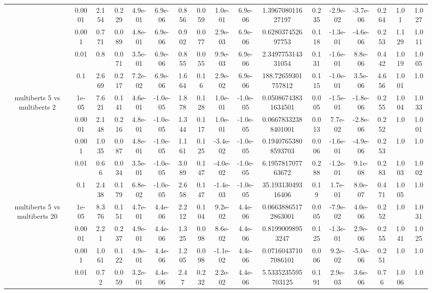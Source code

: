 \begin{tabular}{|c|c|c|c|c|c|c|c|c|c|c|c|c|c|c|c|c|}
 & 0.0001 & 2.154 & 0.229 & 4.9e-01 & 6.9e-06 & 0.856 & 0.059 & 1.0e-01 & 6.9e-06 & 1.396708011627197 & 0.235 & -2.9e-02 & -3.7e-06 & 0.264 & 1.01 & 1.027 \\
 & 0.001 & 0.771 & 0.089 & 4.8e-01 & 6.9e-06 & 0.902 & 0.077 & 2.9e-03 & 6.9e-06 & 0.628037452697753 & 0.118 & -1.3e-01 & -4.6e-06 & 0.253 & 1.129 & 1.011 \\
 & 0.01 & 0.8 & 0.071 & 3.5e-01 & 6.9e-06 & 0.855 & 0.055 & 9.9e-03 & 6.9e-06 & 2.349775314331054 & 0.131 & -1.6e-01 & 8.8e-06 & 0.442 & 1.019 & 1.005 \\
 & 0.1 & 2.669 & 0.217 & 7.2e-02 & 6.9e-06 & 1.664 & 0.16 & 2.9e-02 & 6.9e-06 & 188.72659301757812 & 0.115 & -1.0e-01 & 3.5e-06 & 4.656 & 1.001 & 1.0 \\
\hline
\multirow{5}{*}{multiberts 5 vs multiberts 2} & 1e-05 & 7.621 & 0.141 & 4.6e-01 & -1.0e-05 & 1.878 & 0.128 & 1.0e-01 & -1.0e-05 & 0.05086743831634501 & 0.005 & -1.5e-01 & -1.8e-06 & 0.255 & 1.004 & 1.033 \\
 & 0.0001 & 2.148 & 0.216 & 4.8e-01 & -1.0e-05 & 1.344 & 0.117 & 1.0e-01 & -1.0e-05 & 0.06678332388401001 & 0.013 & 7.7e-02 & -2.8e-06 & 0.252 & 1.0 & 1.001 \\
 & 0.001 & 1.035 & 0.087 & 4.8e-01 & -1.0e-05 & 1.161 & 0.125 & -3.4e-02 & -1.0e-05 & 0.19407653808593703 & 0.006 & -1.6e-01 & -4.9e-06 & 0.253 & 1.0 & 1.0 \\
 & 0.01 & 0.66 & 0.034 & 3.5e-01 & -1.0e-05 & 3.089 & 0.147 & -4.0e-02 & -1.0e-05 & 6.195781707763672 & 0.288 & -1.2e-01 & 9.1e-08 & 0.283 & 1.003 & 1.002 \\
 & 0.1 & 2.438 & 0.179 & 6.8e-02 & -1.0e-05 & 2.658 & 0.147 & -1.4e-03 & -1.0e-05 & 35.19313049316406 & 0.19 & 1.7e-01 & 8.0e-07 & 0.471 & 1.005 & 1.0 \\
\hline
\multirow{5}{*}{multiberts 5 vs multiberts 20} & 1e-05 & 8.376 & 0.151 & 4.7e-01 & 4.4e-06 & 2.212 & 0.104 & 9.2e-02 & 4.4e-06 & 0.06638865172863001 & 0.005 & -7.9e-02 & 4.0e-06 & 0.252 & 1.0 & 1.031 \\
 & 0.0001 & 2.21 & 0.237 & 4.9e-01 & 4.4e-06 & 1.325 & 0.098 & 8.6e-02 & 4.4e-06 & 0.81990098953247 & 0.125 & -1.3e-01 & 2.9e-06 & 0.255 & 1.041 & 1.025 \\
 & 0.001 & 1.061 & 0.122 & 4.9e-01 & 4.4e-06 & 1.205 & 0.098 & -1.1e-02 & 4.4e-06 & 0.07160437107086101 & 0.006 & 9.2e-02 & -5.0e-06 & 0.251 & 1.0 & 1.0 \\
 & 0.01 & 0.72 & 0.059 & 3.2e-01 & 4.4e-06 & 2.47 & 0.232 & 2.2e-02 & 4.4e-06 & 5.5335235595703125 & 0.191 & 2.9e-03 & 3.6e-06 & 0.76 & 1.006 & 1.0 \\

\end{tabular}
